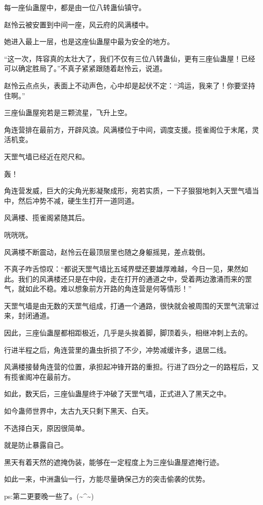 \begin{this_body}
每一座仙蛊屋中，都是由一位八转蛊仙镇守。

赵怜云被安置到中间一座，风云府的风满楼中。

她进入最上一层，也是这座仙蛊屋中最为安全的地方。

“这一次，阵容真的太壮大了，我们不仅有三位八转蛊仙，更有三座仙蛊屋！已经可以确定胜局了。”不真子紧紧跟随着赵怜云，说道。

赵怜云点点头，表面上不动声色，心中却是起伏不定：“鸿运，我来了！你要坚持住啊。”

三座仙蛊屋宛若是三颗流星，飞升上空。

角连营排在最前方，开辟风浪。风满楼位于中间，调度支援。揽雀阁位于末尾，灵活机变。

天罡气墙已经近在咫尺和。

轰！

角连营发威，巨大的尖角光影凝聚成形，宛若实质，一下子狠狠地刺入天罡气墙当中，然后冲势不减，硬生生打开一道同道。

风满楼、揽雀阁紧随其后。

咣咣咣。

风满楼不断震动，赵怜云在最顶层里也随之身躯摇晃，差点栽倒。

不真子咋舌惊叹：“都说天罡气墙比五域界壁还要雄厚难越，今日一见，果然如此。我们的风满楼还只是在中段，走在打开的通道之中，受着两边激涌而来的罡气，就如此不稳。难以想象前方开路的角连营是何等情形！”

天罡气墙是由无数的天罡气组成，打通一个通路，很快就会被周围的天罡气流窜过来，封闭通道。

因此，三座仙蛊屋都相距极近，几乎是头挨着脚，脚顶着头，相继冲刺上去的。

行进半程之后，角连营里的蛊虫折损了不少，冲势减缓许多，退居二线。

风满楼接替角连营的位置，承担起冲锋开路的重担。行进了四分之一的路程后，又有揽雀阁冲在最前方。

如此，数天后，三座仙蛊屋终于冲破了天罡气墙，正式进入了黑天之中。

如今蛊师世界中，太古九天只剩下黑天、白天。

不选择白天，原因很简单。

就是防止暴露自己。

黑天有着天然的遮掩伪装，能够在一定程度上为三座仙蛊屋遮掩行迹。

如此一来，中洲蛊仙一行，方能尽量确保己方的突击偷袭的优势。

ps:第二更要晚一些了。(\~{}\^{}\~{})

\end{this_body}

